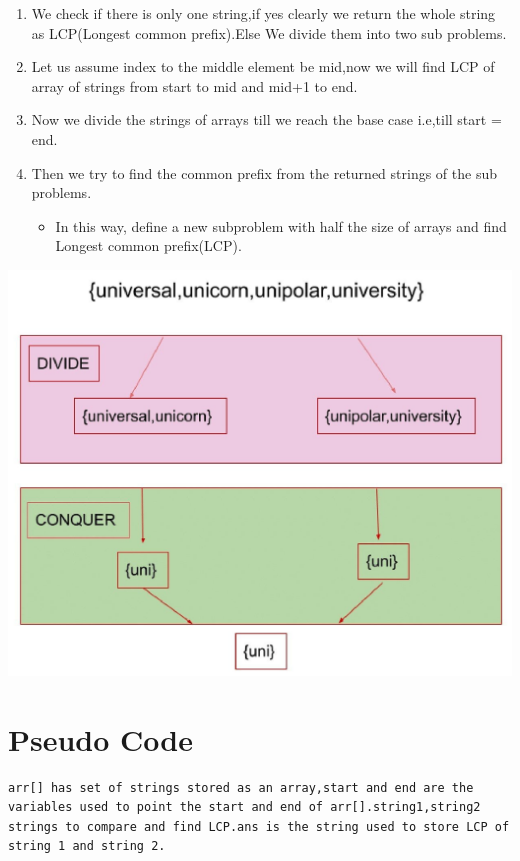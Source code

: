 \documentclass{article}
\begin{document}
\begin{multicols}{2}
\begin{enumerate}
\item We check if there is only one string,if yes clearly we return the whole string as LCP(Longest common prefix).Else We divide them into two sub problems.
\item Let us assume index to the middle element be mid,now we will find LCP of array of strings from start to mid and mid+1 to end.
\item Now we divide the strings of arrays till we reach the base case i.e,till start = end.
\item Then we try to find the common prefix from the returned strings of the sub problems.
\begin{itemize}
\item In this way, define a new subproblem with half the size of arrays and find Longest common prefix(LCP).
\end{itemize}
\end{enumerate}

\begin{center}
\includegraphics[scale=0.15]{example_as04.jpg}
\end{center}

\section{Pseudo Code}

\begin{lstlisting}
arr[] has set of strings stored as an array,start and end are the variables used to point the start and end of arr[].string1,string2 strings to compare and find LCP.ans is the string used to store LCP of string 1 and string 2.


\end{lstlisting}
\end{multicols}
\end{document}
